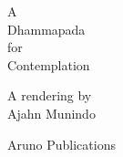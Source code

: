 \documentclass[11pt]{article}
\begin{document}
\thispagestyle{empty}
\color{black!85}

\vspace*{10mm}

{\centering

\chapterTitleFont\LARGE

A\\
Dhammapada\\
for\\
Contemplation

\vspace*{10mm}

\normalsize

A rendering by\\
Ajahn Munindo

\vfill


Aruno Publications

}

\vspace*{10mm}
\end{document}
